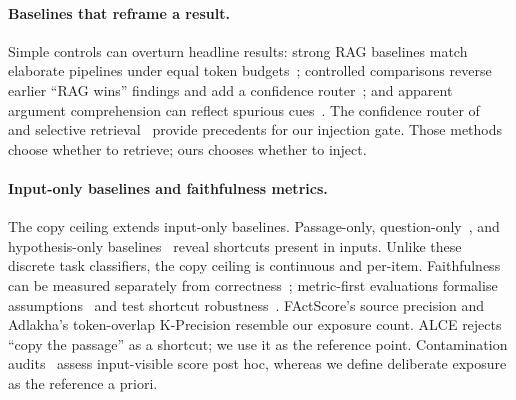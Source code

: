 \documentclass[10pt,twocolumn]{article}
\begin{document}
\paragraph{Baselines that reframe a result.}
Simple controls can overturn headline results: strong RAG baselines match elaborate pipelines under equal token budgets~\cite{laitenberger2025stronger}; controlled comparisons reverse earlier ``RAG wins'' findings and add a confidence router~\cite{li2024ragorlongcontext}; and apparent argument comprehension can reflect spurious cues~\cite{niven2019probing}. The confidence router of~\textcite{li2024ragorlongcontext} and selective retrieval~\cite{asai2024selfrag,jeong2024adaptiverag,mallen2023trust} provide precedents for our injection gate. Those methods choose whether to retrieve; ours chooses whether to inject.

\paragraph{Input-only baselines and faithfulness metrics.}
The copy ceiling extends input-only baselines. Passage-only, question-only~\cite{kaushik2018reading}, and hypothesis-only baselines~\cite{gururangan2018artifacts,poliak2018hypothesis} reveal shortcuts present in inputs. Unlike these discrete task classifiers, the copy ceiling is continuous and per-item. Faithfulness can be measured separately from correctness~\cite{es2023ragas,adlakha2024evaluating,zhou2023contextfaithful}; metric-first evaluations formalise assumptions~\cite{min2023factscore} and test shortcut robustness~\cite{gao2023alce}. FActScore's source precision and Adlakha's token-overlap K-Precision resemble our exposure count. ALCE rejects ``copy the passage'' as a shortcut; we use it as the reference point. Contamination audits~\cite{sainz2023contamination,golchin2024timetravel} assess input-visible score post hoc, whereas we define deliberate exposure as the reference a priori.
\end{document}
